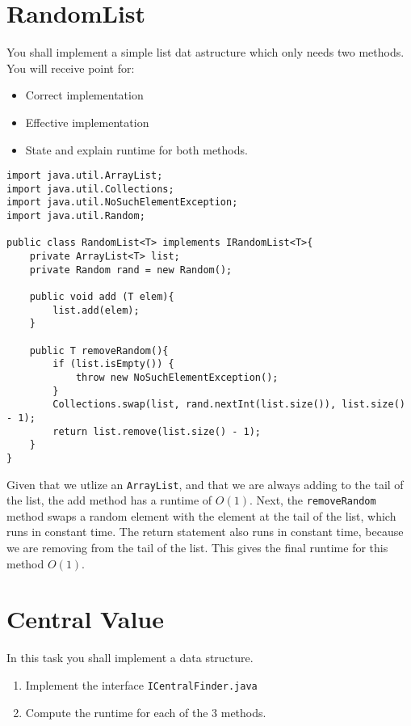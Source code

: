 \documentclass{article}
\begin{document}
    \section{RandomList}
    You shall implement a simple list dat astructure which only needs two methods. You will receive point for:
    
    \begin{itemize}
        \item Correct implementation
        \item Effective implementation
        \item State and explain runtime for both methods.
    \end{itemize}

    \begin{ans}
        \hspace{1em}
    \begin{lstlisting}
import java.util.ArrayList;
import java.util.Collections;
import java.util.NoSuchElementException;
import java.util.Random;

public class RandomList<T> implements IRandomList<T>{
    private ArrayList<T> list;
    private Random rand = new Random();

    public void add (T elem){
        list.add(elem);
    }

    public T removeRandom(){
        if (list.isEmpty()) {
            throw new NoSuchElementException();
        }
        Collections.swap(list, rand.nextInt(list.size()), list.size() - 1);
        return list.remove(list.size() - 1);
    }
} 
    \end{lstlisting}

    Given that we utlize an \texttt{ArrayList}, and that we are always adding to the tail of the list, the add method has a runtime of \( O\left( 1 \right) \). Next, the \texttt{removeRandom} method swaps a random element with the element at the tail of the list, which runs in constant time. The return statement also runs in constant time, because we are removing from the tail of the list. This gives the final runtime for this method \( O\left( 1 \right) \).
    \end{ans}

    \section{Central Value}
    In this task you shall implement a data structure.

    \begin{enumerate}
        \item Implement the interface \texttt{ICentralFinder.java}
        \item Compute the runtime for each of the 3 methods.
    \end{enumerate}
\end{document}
